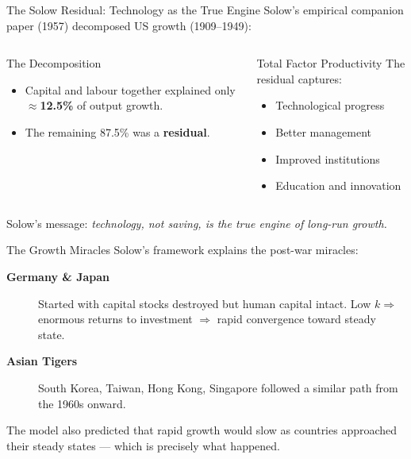 \documentclass[aspectratio=169, 10pt]{beamer}
\begin{document}
\begin{frame}{The Solow Residual: Technology as the True Engine}
Solow's empirical companion paper (1957) decomposed US growth
(1909--1949):
\vspace{0.5em}
\begin{columns}[T]
\begin{block}{The Decomposition}
  \begin{itemize}
    \item Capital and labour together explained only
          $\approx$\textbf{12.5\%} of output growth.
    \item The remaining \alert{87.5\%} was a \textbf{residual}.
  \end{itemize}
\end{block}
\begin{block}{Total Factor Productivity}
  The residual captures:
  \begin{itemize}
    \item Technological progress
    \item Better management
    \item Improved institutions
    \item Education and innovation
  \end{itemize}
\end{block}
\end{columns}
\vspace{0.5em}
Solow's message: \textit{technology, not saving,
is the true engine of long-run growth.}
\end{frame}

\begin{frame}{The Growth Miracles}
Solow's framework explains the post-war miracles:
\vspace{0.5em}
\begin{description}
  \item[\textbf{Germany \& Japan}] Started with capital stocks destroyed
        but human capital intact.
        Low $k \Rightarrow$ enormous returns to investment $\Rightarrow$
        rapid convergence toward steady state.
  \item[\textbf{Asian Tigers}] South Korea, Taiwan, Hong Kong, Singapore
        followed a similar path from the 1960s onward.
\end{description}
\vspace{0.5em}
The model also predicted that rapid growth would \alert{slow} as
countries approached their steady states --- which is precisely
what happened.
\end{frame}
\end{document}
